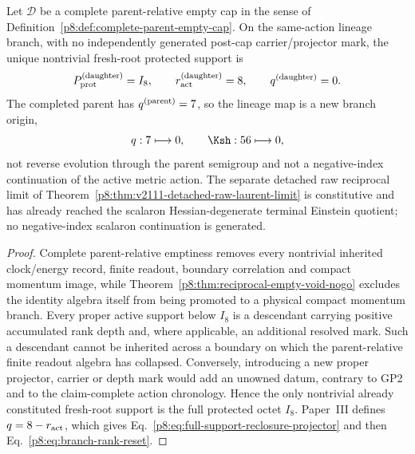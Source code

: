 \documentclass[12pt,a4paper]{article}
\begin{document}
\begin{theorem}
\label{p8:lem:full-support-branch-reclosure}
\label{p8:thm:complete-cap-structural-reclosure}
Let \(\mathcal D\) be a complete parent-relative empty cap in the sense of
Definition~\ref{p8:def:complete-parent-empty-cap}.  On the same-action lineage
branch, with no independently generated post-cap carrier/projector mark, the
unique nontrivial fresh-root protected support is
\begin{equation}
\label{p8:eq:full-support-reclosure-projector}
 P_{\rm prot}^{({\rm daughter})}=I_8,
 \qquad r_{\rm act}^{({\rm daughter})}=8,
 \qquad q^{({\rm daughter})}=0.
\end{equation}
The completed parent has \(q^{({\rm parent})}=7\), so the lineage map is a
new branch origin,
\begin{equation}
\label{p8:eq:branch-rank-reset}
 q:7\longmapsto0,
 \qquad \Ksh:56\longmapsto0,
\end{equation}
not reverse evolution through the parent semigroup and not a negative-index
continuation of the active metric action.  The separate detached raw reciprocal
limit of Theorem~\ref{p8:thm:v2111-detached-raw-laurent-limit} is constitutive
and has already reached the scalaron Hessian-degenerate terminal Einstein
quotient; no negative-index scalaron continuation is generated.
\end{theorem}

\begin{proof}
Complete parent-relative emptiness removes every nontrivial inherited
clock/energy record, finite readout, boundary correlation and compact momentum
image, while Theorem~\ref{p8:thm:reciprocal-empty-void-nogo} excludes the
identity algebra itself from being promoted to a physical compact momentum
branch.  Every proper active support below \(I_8\) is a descendant carrying
positive accumulated rank depth and, where applicable, an additional
resolved mark.  Such a descendant cannot be inherited across a boundary on
which the parent-relative finite readout algebra has collapsed.  Conversely,
introducing a new proper projector, carrier or depth mark would add an
unowned datum, contrary to GP2 and to the claim-complete action chronology.
Hence the only nontrivial already constituted fresh-root support is the full
protected octet \(I_8\).  Paper~III defines \(q=8-r_{\rm act}\), which gives
Eq.~\eqref{p8:eq:full-support-reclosure-projector} and then
Eq.~\eqref{p8:eq:branch-rank-reset}.
\end{proof}
\end{document}
